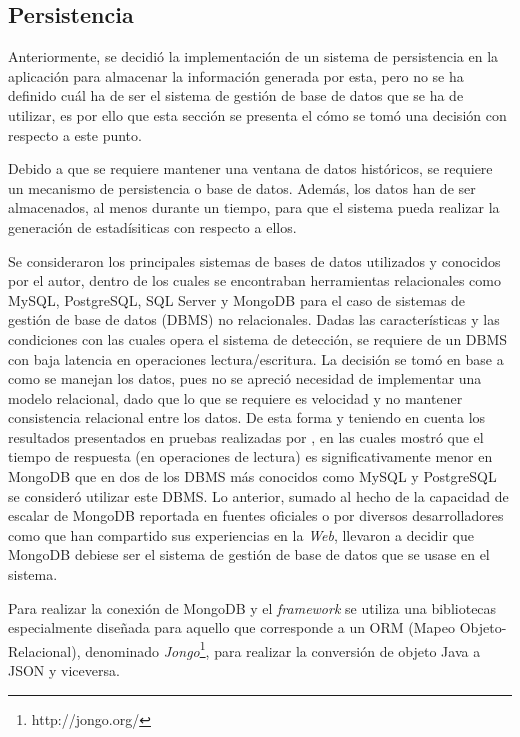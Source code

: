 \subsection{Persistencia}
\label{sec:diseno:persistencia}

Anteriormente, se decidió la implementación de un sistema de persistencia en la aplicación para almacenar la información generada por esta, pero no se ha definido cuál ha de ser el sistema de gestión de base de datos que se ha de utilizar, es por ello que esta sección se presenta el cómo se tomó una decisión con respecto a este punto.

Debido a que se requiere mantener una ventana de datos históricos, se requiere un mecanismo de persistencia o base de datos. Además, los datos han de ser almacenados, al menos durante un tiempo, para que el sistema pueda realizar la generación de estadísiticas con respecto a ellos.

Se consideraron los principales sistemas de bases de datos utilizados y conocidos por el autor, dentro de los cuales se encontraban herramientas relacionales como MySQL, PostgreSQL, SQL Server y MongoDB para el caso de sistemas de gestión de base de datos (DBMS) no relacionales. Dadas las características y las condiciones con las cuales opera el sistema de detección, se requiere de un DBMS con baja latencia en operaciones lectura/escritura. La decisión se tomó en base a como se manejan los datos, pues no se apreció necesidad de implementar una modelo relacional, dado que lo que se requiere es velocidad y no mantener consistencia relacional entre los datos. De esta forma y teniendo en cuenta los resultados presentados en pruebas realizadas por \cite{MongoPerformance}, en las cuales mostró que el tiempo de respuesta (en operaciones de lectura) es significativamente menor en MongoDB que en dos de los DBMS más conocidos como MySQL y PostgreSQL se consideró utilizar este DBMS. Lo anterior, sumado al hecho de la capacidad de escalar de MongoDB reportada en fuentes oficiales o por diversos desarrolladores como \cite{MongoDBScalability} que han compartido sus experiencias en la \textit{Web}, llevaron a decidir que MongoDB debiese ser el sistema de gestión de base de datos que se usase en el sistema.

Para realizar la conexión de MongoDB y el \textit{framework} se utiliza una bibliotecas especialmente diseñada para aquello que corresponde a un ORM (Mapeo Objeto-Relacional), denominado \textit{Jongo}\footnote{http://jongo.org/}, para realizar la conversión de objeto Java a JSON y viceversa.

